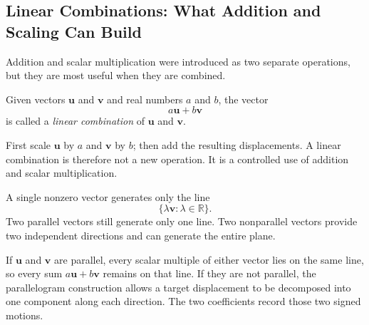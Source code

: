 \subsection{Linear Combinations: What Addition and Scaling Can Build}

Addition and scalar multiplication were introduced as two separate operations,
but they are most useful when they are combined.

\begin{definitionbox}
Given vectors $\mathbf u$ and $\mathbf v$ and real numbers $a$ and $b$, the
vector
\[
\boxed{a\mathbf u+b\mathbf v}
\]
is called a \emph{linear combination} of $\mathbf u$ and $\mathbf v$.
\end{definitionbox}

\begin{interpretationbox}
First scale $\mathbf u$ by $a$ and $\mathbf v$ by $b$; then add the resulting
displacements. A linear combination is therefore not a new operation. It is a
controlled use of addition and scalar multiplication.
\end{interpretationbox}

\begin{center}
\end{center}

\begin{corebox}
A single nonzero vector generates only the line
\[
\{\lambda\mathbf v:\lambda\in\mathbb R\}.
\]
Two parallel vectors still generate only one line. Two nonparallel vectors
provide two independent directions and can generate the entire plane.
\end{corebox}

\begin{proofbox}
If $\mathbf u$ and $\mathbf v$ are parallel, every scalar multiple of either
vector lies on the same line, so every sum $a\mathbf u+b\mathbf v$ remains on
that line. If they are not parallel, the parallelogram construction allows a
target displacement to be decomposed into one component along each direction.
The two coefficients record those two signed motions.
\end{proofbox}

